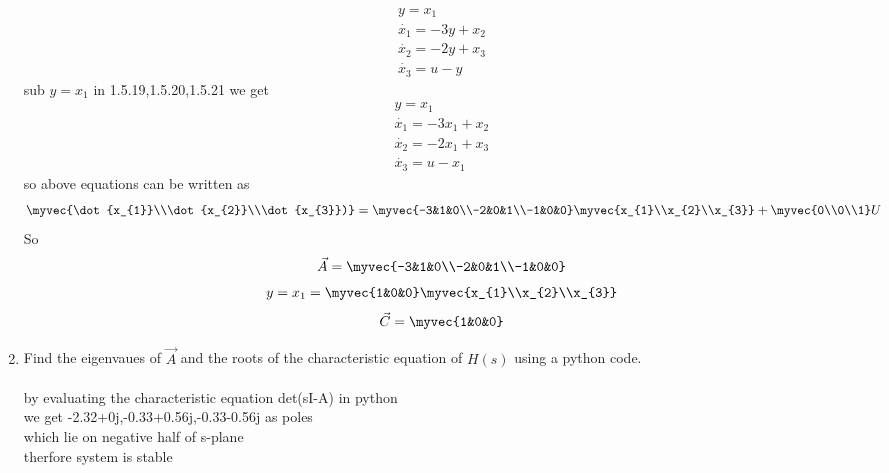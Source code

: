 \begin{enumerate}[label=\thesection.\arabic*.,ref=\thesection.\theenumi]
\begin{align}
y=x_{1}\\
\dot{x_{1}}=-3y+x_{2}\\
\dot{x_{2}}=-2y+x_{3}\\
\dot{x_{3}}=u-y
\end{align} 
sub $ y=x_{1}$ in 1.5.19,1.5.20,1.5.21 we get
\begin{align}
 y=x_{1}\\
\dot{x_{1}}=-3x_{1}+x_{2}\\
\dot{x_{2}}=-2x_{1}+x_{3}\\
\dot{x_{3}}=u-x_{1}
\end{align} 
so above equations can be written as
\begin{align}
\myvec{\dot{x_{1}}\\\dot{x_{2}}\\\dot{x_{3}})}
=
\myvec{-3&1&0\\-2&0&1\\-1&0&0}\myvec{x_{1}\\x_{2}\\x_{3}}
+
\myvec{0\\0\\1}  U
\end{align}
So 
\begin{align}
\vec{A}=\myvec{-3&1&0\\-2&0&1\\-1&0&0}
\end{align}
\begin{align}
y=x_{1}
=\myvec{1&0&0} \myvec{x_{1}\\x_{2}\\x_{3}}
\end{align}
\begin{align}
\vec{C}=\myvec{1&0&0}
\end{align}



\item Find the eigenvaues of $\vec{A}$ and the roots of the characteristic equation of $H(s)$ using a python code.
\\
\solution 
\\ by evaluating the characteristic equation det(sI-A) in python 
\\we get -2.32+0j,-0.33+0.56j,-0.33-0.56j as poles
\\which lie on negative half of s-plane 
\\therfore system is stable
\end{enumerate}